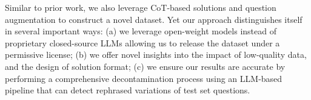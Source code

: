 Similar to prior work, we also leverage CoT-based solutions and question augmentation to construct a novel dataset. Yet our approach distinguishes itself in several important ways: (a) we leverage open-weight models instead of proprietary closed-source LLMs allowing us to release the dataset under a permissive license; (b) we offer novel insights into the impact of low-quality data, and the design of solution format; (c) we ensure our results are accurate by performing a comprehensive decontamination process using an LLM-based pipeline that can detect rephrased variations of test set questions.
























 









